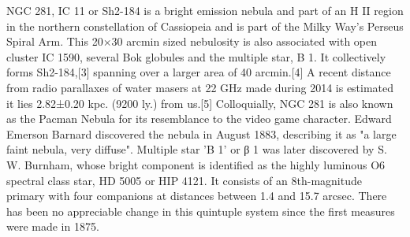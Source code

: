 NGC 281, IC 11 or Sh2-184 is a bright emission nebula and part of an H II region in the northern constellation of Cassiopeia and is part of the Milky Way's Perseus Spiral Arm. This 20×30 arcmin sized nebulosity is also associated with open cluster IC 1590, several Bok globules and the multiple star, B 1. It collectively forms Sh2-184,[3] spanning over a larger area of 40 arcmin.[4] A recent distance from radio parallaxes of water masers at 22 GHz made during 2014 is estimated it lies 2.82±0.20 kpc. (9200 ly.) from us.[5] Colloquially, NGC 281 is also known as the Pacman Nebula for its resemblance to the video game character. Edward Emerson Barnard discovered the nebula in August 1883, describing it as "a large faint nebula, very diffuse". Multiple star 'B 1' or β 1 was later discovered by S. W. Burnham, whose bright component is identified as the highly luminous O6 spectral class star, HD 5005 or HIP 4121. It consists of an 8th-magnitude primary with four companions at distances between 1.4 and 15.7 arcsec. There has been no appreciable change in this quintuple system since the first measures were made in 1875.
